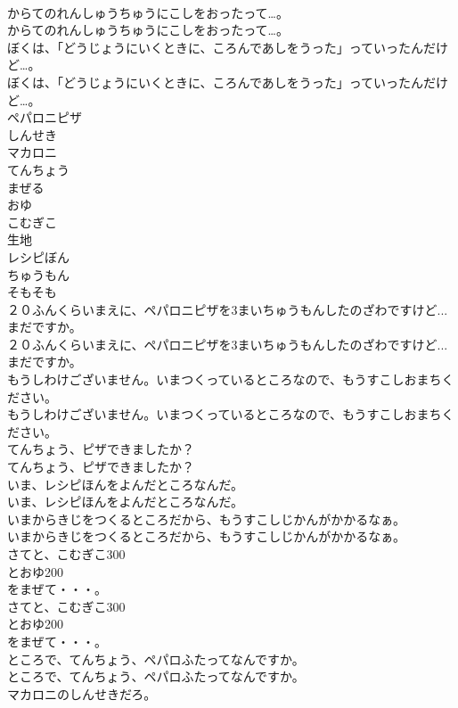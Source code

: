 \documentclass[8pt]{extreport}
\begin{document}
\begin{CJK}{UTF8}{min}
\\	からてのれんしゅうちゅうにこしをおったって…。
\\	からてのれんしゅうちゅうにこしをおったって…。
\\	ぼくは、「どうじょうにいくときに、ころんであしをうった」っていったんだけど…。
\\	ぼくは、「どうじょうにいくときに、ころんであしをうった」っていったんだけど…。
\\	ペパロニピザ
\\	しんせき
\\	マカロニ
\\	てんちょう
\\	まぜる
\\	おゆ
\\	こむぎこ
\\	生地
\\	レシピぼん
\\	ちゅうもん
\\	そもそも
\\	２０ふんくらいまえに、ペパロニピザを3まいちゅうもんしたのざわですけど...まだですか。
\\	２０ふんくらいまえに、ペパロニピザを3まいちゅうもんしたのざわですけど...まだですか。
\\	もうしわけございません。いまつくっているところなので、もうすこしおまちください。
\\	もうしわけございません。いまつくっているところなので、もうすこしおまちください。
\\	てんちょう、ピザできましたか？
\\	てんちょう、ピザできましたか？
\\	いま、レシピほんをよんだところなんだ。
\\	いま、レシピほんをよんだところなんだ。
\\	いまからきじをつくるところだから、もうすこしじかんがかかるなぁ。
\\	いまからきじをつくるところだから、もうすこしじかんがかかるなぁ。
\\	さてと、こむぎこ300
\\	とおゆ200
\\	をまぜて・・・。
\\	さてと、こむぎこ300
\\	とおゆ200
\\	をまぜて・・・。
\\	ところで、てんちょう、ペパロふたってなんですか。
\\	ところで、てんちょう、ペパロふたってなんですか。
\\	マカロニのしんせきだろ。

\end{CJK}
\end{document}
